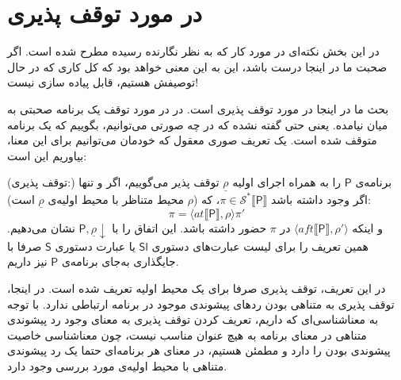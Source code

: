 \section{در مورد توقف پذیری}

در این بخش نکته‌ای در مورد کار که به نظر نگارنده رسیده مطرح شده است. اگر صحبت ما در اینجا درست باشد، این به این معنی خواهد بود که کل کاری که در حال توصیفش هستیم، قابل پیاده سازی نیست!

بحث ما در اینجا در مورد توقف پذیری است. در \cite{calcul} در مورد توقف یک برنامه صحبتی به میان نیامده. یعنی حتی گفته نشده که در چه صورتی می‌توانیم، بگوییم که یک برنامه متوقف شده است. یک تعریف  صوری معقول که خودمان می‌توانیم برای این معنا، بیاوریم این است:

\begin{defn}
(توقف پذیری:) برنامه‌ی $\mathsf{P}$ را به همراه اجرای اولیه $\underline{\rho}$ توقف پذیر می‌گوییم، اگر و تنها اگر وجود داشته باشد 
	$\pi \in \mathcal{S}^* \llbracket \mathsf{P} \rrbracket$، 
	که ($\rho$ محیط متناظر با محیط اولیه‌ی $\underline{\rho}$ است):
	$$\pi = \langle at \llbracket \mathsf{P} \rrbracket , \rho \rangle \pi'$$
	و اینکه $\langle aft\llbracket \mathsf{P} \rrbracket , \rho' \rangle$ در $\pi$ حضور داشته باشد. این اتفاق را با 
	$\mathsf{P,\underline{\rho}\downarrow}$
	نشان می‌دهیم. همین تعریف را برای لیست عبارت‌های دستوری $\mathsf{Sl}$ یا عبارت‌ دستوری $\mathsf{S}$ صرفا با جایگذاری به‌جای برنامه‌ی $\mathsf{P}$ نیز داریم.
\end{defn} 
در این تعریف، توقف پذیری صرفا برای یک محیط اولیه تعریف شده است.
در اینجا، توقف پذیری به متناهی بودن ردهای پیشوندی موجود در برنامه ارتباطی ندارد. با توجه به معناشناسی‌ای که داریم، تعریف کردن توقف پذیری به معنای وجود رد پیشوندی متناهی در معنای برنامه به هیچ عنوان مناسب نیست، چون معناشناسی خاصیت پیشوندی بودن را دارد و مطمئن هستیم، در معنای هر برنامه‌ای حتما یک رد پیشوندی متناهی با محیط اولیه‌ی مورد بررسی وجود دارد.

